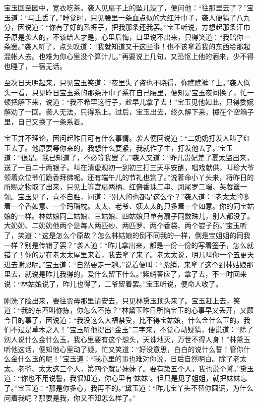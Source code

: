 \documentclass[12pt,oneside]{book}
\begin{document}
宝玉回至园中，宽衣吃茶。袭人见扇子上的坠儿没了，便问他：“往那里去了？”宝玉道：“马上丢了。”睡觉时，只见腰里一条血点似的大红汗巾子，袭人便猜了八九分，因说道：“你有了好的系裤子，把我那条还我罢。”宝玉听说，方想起那条汗巾子原是袭人的，不该给人才是，心里后悔，口里说不出来，只得笑道：“我赔你一条罢。”袭人听了，点头叹道：“我就知道又干这些事！也不该拿着我的东西给那起混帐人去。也难为你心里没个算计儿。”再要说上几句，又恐怄上他的酒来，少不得也睡了，一宿无话。

至次日天明起来，只见宝玉笑道：“夜里失了盗也不晓得，你瞧瞧裤子上。”袭人低头一看，只见昨日宝玉系的那条汗巾子系在自己腰里，便知是宝玉夜间换了，忙一顿把解下来，说道：“我不希罕这行子，趁早儿拿了去！”宝玉见他如此，只得委婉解劝了一回。袭人无法，只得系上。过后，宝玉出去，终久解下来，掷在个空箱子里，自己又换了一条系着。

宝玉并不理论，因问起昨日可有什么事情。袭人便回说道：“二奶奶打发人叫了红玉去了。他原要等你来的，我想什么要紧，我就作了主，打发他去了。”宝玉道：“很是。我已知道了，不必等我罢了。”袭人又道：“昨儿贵妃差了夏太监出来，送了一百二十两银子。叫在清虚观初一到初三打三天平安醮，唱戏献供，叫珍大爷领着众位爷们跪香拜佛呢。还有端午儿的节礼也赏了。”说着命小丫头来，将昨日的所赐之物取了出来，只见上等宫扇两柄、红麝香珠二串、凤尾罗二端、芙蓉簟一领。宝玉见了，喜不自胜，问道：“别人的也都是这么个？”袭人道：“老太太的多着一个香如意、一个玛瑙枕。太太、老爷、姨太太的只多着一个如意。你的同宝姑娘的一样。林姑娘同二姑娘、三姑娘、四姑娘只单有扇子同数珠儿，别人都没了。大奶奶、二奶奶他两个是每人两匹纱、两匹罗、两个香袋、两个锭子药。”宝玉听了，笑道：“这是怎么个原故？怎么林姑娘的倒不同我的一样，倒是宝姐姐的同我一样？别是传错了罢？”袭人道：“昨儿拿出来，都是一份一份的写着签子，怎么就错了！你的是在老太太屋里来着，我去拿了来了。老太太说，明儿叫你一个五更天进去谢恩呢。”宝玉道：“自然要走一趟。”说着便叫：“紫绡，来拿了这个到林姑娘那里去，就说是昨儿我得的，爱什么留下什么。”紫绡答应了，拿了去，不一时回来说：“林姑娘说了，昨儿也得了，二爷留着罢。”宝玉听说，便命人收了。

刚洗了脸出来，要往贾母那里请安去，只见林黛玉顶头来了。宝玉赶上去，笑道：“我的东西叫你拣，你怎么不拣？”林黛玉昨日所恼宝玉的心事早又丢开，又顾今日的事了，因说道：“我没这么大福禁受，比不得宝姑娘，什么金什么玉的，我们不过是草木之人！”宝玉听他提出“金玉”二字来，不觉心动疑猜，便说道：“除了别人说什么金什么玉，我心里要有这个想头，天诛地灭，万世不得人身！”林黛玉听他这话，便知他心里动了疑，忙又笑道：“好没意思，白白的说什么誓！管你什么金什么玉的呢！”宝玉道：“我心里的事也难对你说，日后自然明白。除了老太太、老爷、太太这三个人，第四个就是妹妹了。要有第五个人，我也说个誓。”黛玉道：“你也不用说誓，我很知道，你心里有‘妹妹’。但只是见了姐姐，就把妹妹忘了。”宝玉道：“那是你多心，我再不的。”黛玉道：“昨儿宝丫头不替你圆谎，为什么问着我呢？那要是我，你又不知怎么样了。”
\end{document}
